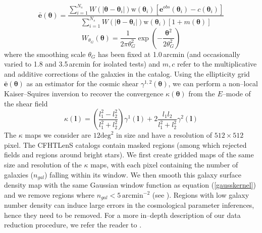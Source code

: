 \documentclass[reprint,aps,prd,superscriptaddress,showkeys,showpacs]{revtex4-1}
\begin{document}
\begin{equation}
\bar{\mathbf{e}}(\pmb{\theta}) = \frac{\sum_{i=1}^{N_s} W(\vert\pmb{\theta}-\pmb{\theta}_i\vert)\mathrm{w}(\pmb{\theta}_i)[\mathbf{e}^{obs}(\pmb{\theta}_i)-c(\pmb{\theta}_i)]}{\sum_{i=1}^{N_s}W(\vert\pmb{\theta}-\pmb{\theta}_i\vert)\mathrm{w}(\pmb{\theta}_i)[1+m(\pmb{\theta})]}
\end{equation} 
\begin{equation}
\label{gausskernel}
W_{\theta_G}(\pmb{\theta}) = \frac{1}{2\pi\theta_G^2}\exp{\left(-\frac{\pmb{\theta}^2}{2\theta_G^2}\right)}
\end{equation}
%
where the smoothing scale $\theta_G$ has been fixed at 1.0\,arcmin (and occasionally varied to 1.8 and 3.5\,arcmin for isolated tests) and $m,c$ refer to the multiplicative and additive corrections of the galaxies in the catalog. Using the ellipticity grid $\bar{\mathbf{e}}(\pmb{\theta})$ as an estimator for the cosmic shear $\gamma^{1,2}(\pmb{\theta})$, we can perform a non--local Kaiser--Squires inversion \citep{KS} to recover the convergence $\kappa(\pmb{\theta})$ from the $E$--mode of the shear field
%
\begin{equation}
\kappa(\mathbf{l}) = \left(\frac{l_1^2-l_2^2}{l_1^2+l_2^2}\right)\gamma^1(\mathbf{l}) + 2\frac{l_1l_2}{l_1^2+l_2^2}\gamma^2(\mathbf{l})
\end{equation}
%
The $\kappa$ maps we consider are $12\mathrm{deg}^2$ in size and have a resolution of $512\times512$ pixel. The CFHTLenS catalogs contain masked regions (among which rejected fields and regions around bright stars). We first create gridded maps of the same size and resolution of the $\kappa$ maps, with each pixel containing the number of galaxies ($n_{gal}$) falling within its window. We then smooth this galaxy surface density map with the same Gaussian window function as equation (\ref{gausskernel}) and we remove regions where $n_{gal} < 5 \,\mathrm{arcmin}^{−2}$ (see \citep{CFHTMasato}). Regions with low galaxy number density can induce large errors in the cosmological parameter inferences, hence they need to be removed. For a more in--depth description of our data reduction procedure, we refer the reader to \citep{Companion}. 

\end{document}
